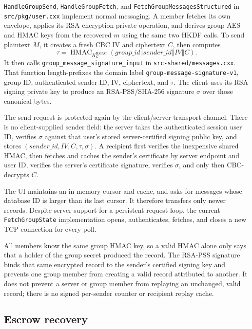 \documentclass[11pt,a4paper]{article}
\begin{document}
\texttt{HandleGroupSend}, \texttt{HandleGroupFetch}, and \texttt{FetchGroupMessagesStructured} in \texttt{src/pkg/user.cxx} implement normal messaging. A member fetches its own envelope, applies its RSA encryption private operation, and derives group AES and HMAC keys from the recovered $m$ using the same two HKDF calls. To send plaintext $M$, it creates a fresh CBC IV and ciphertext $C$, then computes
\[
\tau=\operatorname{HMAC}_{K_G^{\mathrm{HMAC}}}(\textit{group\_id}\mathbin\Vert\textit{sender\_id}\mathbin\Vert IV\mathbin\Vert C).
\]
It then calls \texttt{group\_message\_signature\_input} in \texttt{src-shared/messages.cxx}. That function length-prefixes the domain label \texttt{group-message-signature-v1}, group ID, authenticated sender ID, IV, ciphertext, and $\tau$. The client uses its RSA signing private key to produce an RSA-PSS/SHA-256 signature $\sigma$ over those canonical bytes.

The send request is protected again by the client/server transport channel. There is no client-supplied sender field: the server takes the authenticated session user ID, verifies $\sigma$ against that user's stored server-certified signing public key, and stores $(\mathit{sender\_id},IV,C,\tau,\sigma)$. A recipient first verifies the inexpensive shared HMAC, then fetches and caches the sender's certificate by server endpoint and user ID, verifies the server's certificate signature, verifies $\sigma$, and only then CBC-decrypts $C$.

The UI maintains an in-memory cursor and cache, and asks for messages whose database ID is larger than its last cursor. It therefore transfers only newer records. Despite server support for a persistent request loop, the current \texttt{FetchGroupState} implementation opens, authenticates, fetches, and closes a new TCP connection for every poll.

All members know the same group HMAC key, so a valid HMAC alone only says that a holder of the group secret produced the record. The RSA-PSS signature binds that same encrypted record to the sender's certified signing key and prevents one group member from creating a valid record attributed to another. It does not prevent a server or group member from replaying an unchanged, valid record; there is no signed per-sender counter or recipient replay cache.

\subsection{Escrow recovery}
\end{document}
